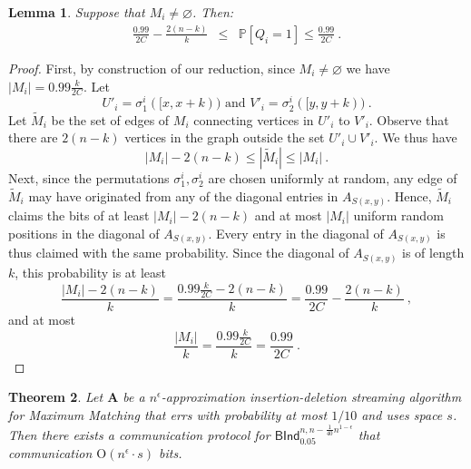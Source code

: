\documentclass[10pt,a4paper]{article}
\newtheorem{theorem}{Theorem}
\newtheorem{lemma}[theorem]{Lemma}
\newcommand{\Order}{\mathrm O}
\renewcommand{\Pr}{\mathbb P}
\begin{document}
\begin{lemma}\label{lem:learn}
 Suppose that $M_i \neq \varnothing$. Then:
 \begin{eqnarray*}
\frac{0.99}{2C} - \frac{2(n - k)}{k} & \le & \Pr \left[ Q_i = 1 \right] \le \frac{0.99}{2C} \ .
%
 \end{eqnarray*}
 
%
\end{lemma}
\begin{proof}
 First, by construction of our reduction, since $M_i \neq \varnothing$ we have 
 $|M_i| = 0.99 \frac{k}{2C}$. 
 Let 
 $$U'_i = \sigma_1^i([x, x+k)) \mbox{ and } V'_i = \sigma_2^i([y, y+k)) \ .$$ 
 Let $\tilde{M}_i$ be the set of edges of $M_i$ connecting vertices in $U'_i$ to $V'_i$. Observe that there are
 $2(n-k)$ vertices in the graph outside the set $U'_i \cup V'_i$. We thus 
 have  
 $$|M_i| - 2(n-k) \le |\tilde{M}_i| \le |M_i|  \ .$$ 
 Next, since the permutations $\sigma^i_1, \sigma^i_2$ are chosen uniformly at random, any edge of $\tilde{M}_i$
 may have originated from any of the diagonal entries in $A_{S(x, y)}$. Hence, $\tilde{M}_i$ claims the bits
 of at least $|M_i| - 2(n-k)$ and at most $|M_i|$ uniform random positions in the diagonal of $A_{S(x, y)}$.
 Every entry in the diagonal of $A_{S(x,y)}$ is thus claimed with the same probability.
 Since the diagonal of $A_{S(x,y)}$ is of length $k$, this probability is at least
 $$ 
 \frac{|M_i| - 2(n-k)}{k} = \frac{0.99 \frac{k}{2C} - 2(n-k)}{k} = \frac{0.99}{2C} - \frac{2(n - k)}{k} \ ,
 $$
 and at most
 $$\frac{|M_i|}{k} = \frac{0.99 \frac{k}{2C}}{k} = \frac{0.99}{2C} \ .$$ 
\end{proof}



%
%

%
%
%
%
%
%
%
%
%
%
%
%




\begin{theorem}\label{thm:reduction} 
 Let $\mathbf{A}$ be a $n^{\epsilon}$-approximation insertion-deletion streaming algorithm 
 for \textsf{Maximum Matching} that errs with probability at most $1/10$ and uses space $s$. Then there exists a communication 
 protocol for $\textsf{BInd}^{n,n - \frac{1}{40} n^{1-\epsilon}}_{0.05}$ that communication $\Order(n^\epsilon \cdot s)$ bits.
\end{theorem}
\end{document}
